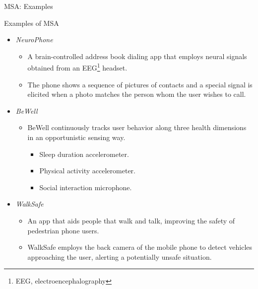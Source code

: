 \begin{frame}{MSA: Examples}
  \begin{block}{Examples of MSA}
    \begin{itemize}
      \item \emph{NeuroPhone} \citep{Campbell2010}
      \begin{itemize}
        \item A brain-controlled address book dialing app that employs neural signals obtained from an EEG\footnote{EEG, electroencephalography} headset.
        \item The phone shows a sequence of pictures of contacts and a special signal is elicited when a photo matches the person whom the user wishes to call.
      \end{itemize}

      \item \emph{BeWell} \citep{Lane2012}
      \begin{itemize}
        \item BeWell continuously tracks user behavior along three health dimensions in an opportunistic sensing way.
        \begin{itemize}
          \item Sleep duration \rightTextArrow accelerometer.
          \item Physical activity \rightTextArrow accelerometer.
          \item Social interaction \rightTextArrow microphone.
        \end{itemize}
      \end{itemize}
  
      \item \emph{WalkSafe} \citep{Wang2012}
      \begin{itemize}
        \item An app that aids people that walk and talk, improving the safety of pedestrian phone users.
        \item WalkSafe employs the back camera of the mobile phone to detect vehicles approaching the user, alerting a potentially unsafe situation.
      \end{itemize}
    \end{itemize}
  \end{block}
\end{frame}

